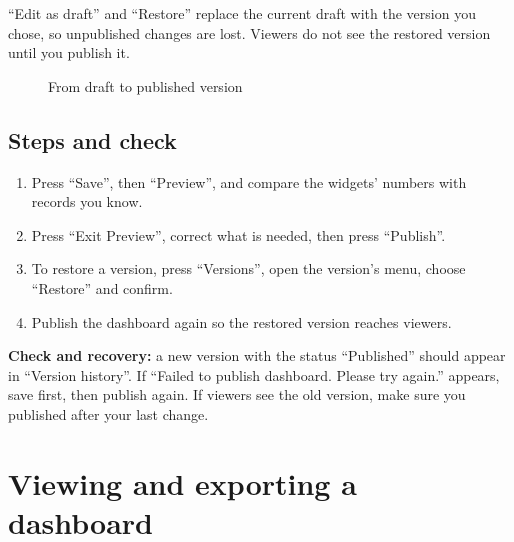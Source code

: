 \begin{rcwarn}
“Edit as draft” and “Restore” replace the current draft with the version you chose, so unpublished changes are lost. Viewers do not see the restored version until you publish it.
\end{rcwarn}

\begin{figure}[H]
\centering
{}
\rclegend
\caption{From draft to published version}
\label{fig:builder-dashboards-publish-flow}
\end{figure}

\subsection{Steps and check}
\begin{enumerate}
\item Press “Save”, then “Preview”, and compare the widgets' numbers with records you know.
\item Press “Exit Preview”, correct what is needed, then press “Publish”.
\item To restore a version, press “Versions”, open the version's menu, choose “Restore” and confirm.
\item Publish the dashboard again so the restored version reaches viewers.
\end{enumerate}

\textbf{Check and recovery:} a new version with the status “Published” should appear in “Version history”. If “Failed to publish dashboard. Please try again.” appears, save first, then publish again. If viewers see the old version, make sure you published after your last change.

\clearpage
\section{Viewing and exporting a dashboard}
\label{sec:builder-feature-dashboards-viewing}

